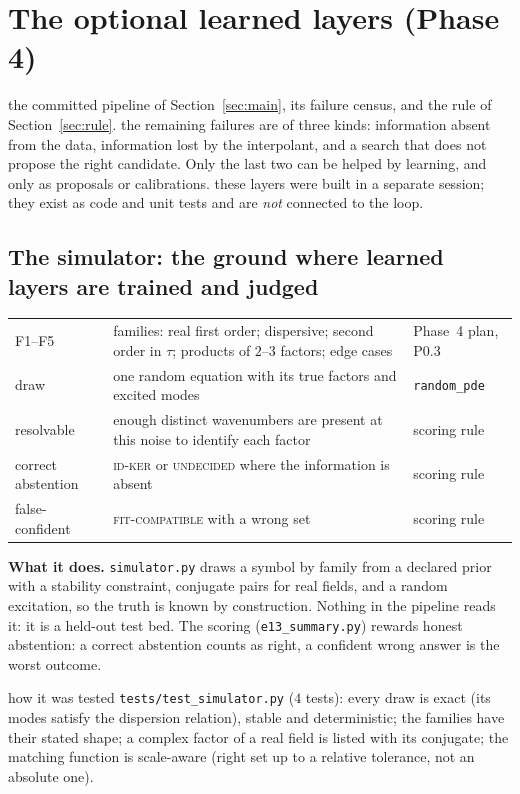 \section{The optional learned layers (Phase 4)}\label{sec:learned}
\sectionbrief
{the committed pipeline of Section~\ref{sec:main}, its failure census, and the rule of Section~\ref{sec:rule}.}
{the remaining failures are of three kinds: information absent from the data, information lost by the interpolant, and a search that does not propose the right candidate. Only the last two can be helped by learning, and only as proposals or calibrations.}
{these layers were built in a separate session; they exist as code and unit tests and are \emph{not} connected to the loop.}

\subsection{The simulator: the ground where learned layers are trained and judged}\label{sec:sim}
\begin{symbols}
\begin{tabular}{@{}L{2.6cm}L{6.0cm}L{4.3cm}@{}}
F1--F5 & families: real first order; dispersive; second order in $\tau$; products of $2$--$3$ factors; edge cases & Phase~4 plan, P0.3\\
draw & one random equation with its true factors and excited modes & \texttt{random\_pde}\\
resolvable & enough distinct wavenumbers are present at this noise to identify each factor & scoring rule\\
correct abstention & \textsc{id-ker} or \textsc{undecided} where the information is absent & scoring rule\\
false-confident & \textsc{fit-compatible} with a wrong set & scoring rule\\
\end{tabular}
\end{symbols}
\textbf{What it does.} \texttt{simulator.py} draws a symbol by family from a declared prior with a stability constraint, conjugate pairs for real fields, and a random excitation, so the truth is known by construction. Nothing in the pipeline reads it: it is a held-out test bed. The scoring (\texttt{e13\_summary.py}) rewards honest abstention: a correct abstention counts as right, a confident wrong answer is the worst outcome.

\begin{explained}{how it was tested}
\texttt{tests/test\_simulator.py} ($4$ tests): every draw is exact (its modes satisfy the dispersion relation), stable and deterministic; the families have their stated shape; a complex factor of a real field is listed with its conjugate; the matching function is scale-aware (right set up to a relative tolerance, not an absolute one).
\end{explained}

